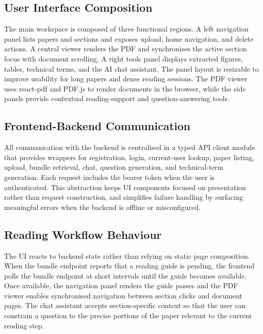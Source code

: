 \documentclass[12pt,a4paper]{report}
\begin{document}
\subsection{User Interface Composition}

The main workspace is composed of three functional regions. A left navigation
panel lists papers and sections and exposes upload, home navigation, and delete
actions. A central viewer renders the PDF and synchronises the active section
focus with document scrolling. A right tools panel displays extracted figures,
tables, technical terms, and the AI chat assistant. The panel layout is
resizable to improve usability for long papers and dense reading sessions.
The PDF viewer uses react-pdf and PDF.js to render documents in the browser,
while the side panels provide contextual reading-support and question-answering
tools.

\subsection{Frontend-Backend Communication}

All communication with the backend is centralised in a typed API client module
that provides wrappers for registration, login, current-user lookup, paper
listing, upload, bundle retrieval, chat, question generation, and technical-term
generation. Each request includes the bearer token when the user is
authenticated. This abstraction keeps UI components focused on presentation
rather than request construction, and simplifies failure handling by surfacing
meaningful errors when the backend is offline or misconfigured.

\subsection{Reading Workflow Behaviour}

The UI reacts to backend state rather than relying on static page composition.
When the bundle endpoint reports that a reading guide is pending, the frontend
polls the bundle endpoint at short intervals until the guide becomes available.
Once available, the navigation panel renders the guide passes and the PDF viewer
enables synchronised navigation between section clicks and document pages. The
chat assistant accepts section-specific context so that the user can constrain a
question to the precise portions of the paper relevant to the current reading
step.

\end{document}
